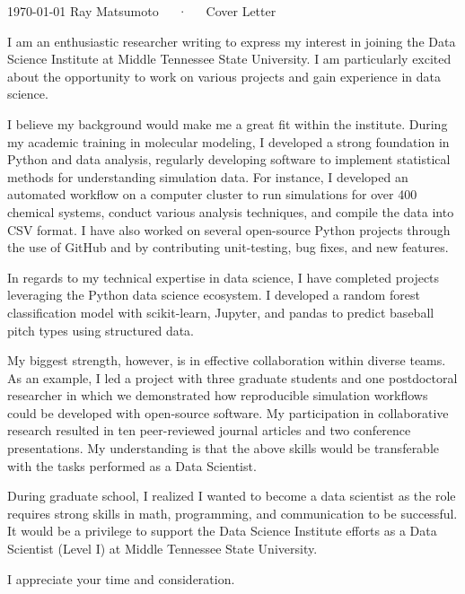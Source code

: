 \documentclass[11pt, a4paper]{awesome-cv}
\begin{document}
\makecvheader[R]

\makecvfooter
  {\today}
  {Ray Matsumoto~~~·~~~Cover Letter}
  {}

\makelettertitle

\begin{cvletter}

I am an enthusiastic researcher writing to express my interest in
    joining the Data Science Institute at Middle Tennessee State University.
    I am particularly excited about the opportunity to work on various projects
    and gain experience in data science.

    I believe my background would make me a great fit within the institute.  During my
    academic training in molecular modeling, I developed a strong foundation in
    Python and data analysis, regularly developing software to implement
    statistical methods for understanding simulation data.  
    For instance, I developed an automated workflow on a computer cluster to run simulations for over 
    400 chemical systems, conduct various analysis techniques, and compile the data into CSV format.  
    I have also worked on several open-source Python
    projects through the use of GitHub and by contributing unit-testing, bug fixes,
    and new features.

    In regards to my technical expertise in data science, I have completed
     projects leveraging the Python data science ecosystem.  I developed
    a random forest classification model with scikit-learn, Jupyter, and
    pandas to predict baseball pitch types using structured data.  

    My biggest strength, however, is in effective collaboration within diverse
    teams.  As an example, I led a project with three graduate students and one
    postdoctoral researcher in which we demonstrated how reproducible simulation workflows could be
    developed with open-source software.  My participation in collaborative
    research resulted in ten peer-reviewed journal articles and two conference presentations.
    My understanding is that the above skills would be
    transferable with the tasks performed as a Data Scientist.

    During graduate school, I realized I wanted to become a data scientist as the role requires strong skills in math, programming, and communication to be successful.
    It would be a privilege to support the Data Science Institute efforts as a
    Data Scientist (Level I) at Middle Tennessee State University.

    I appreciate your time and consideration.

\end{cvletter}


\makeletterclosing
\end{document}
